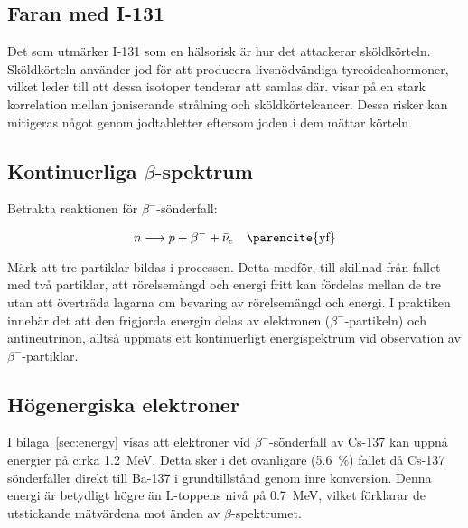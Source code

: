 \subsection{Faran med I-131}

Det som utmärker I-131 som en hälsorisk är hur det attackerar sköldkörteln.
Sköldkörteln använder jod för att producera livsnödvändiga tyreoideahormoner,
vilket leder till att dessa isotoper tenderar att samlas där. \cite{iodine}
visar på en stark korrelation mellan joniserande strålning och
sköldkörtelcancer. Dessa risker kan mitigeras något genom jodtabletter eftersom
joden i dem mättar körteln.

\subsection{Kontinuerliga $\beta$-spektrum}

Betrakta reaktionen för $\beta^-$-sönderfall:

\begin{equation}
    n \longrightarrow p + \beta^- + \bar{\nu}_e \quad \text{\parencite{yf}}
\end{equation}

Märk att tre partiklar bildas i processen. Detta medför, till skillnad från
fallet med två partiklar, att rörelsemängd och energi fritt kan fördelas
mellan de tre utan att överträda lagarna om bevaring av rörelsemängd och
energi. I praktiken innebär det att den frigjorda energin delas av elektronen
($\beta^-$-partikeln) och antineutrinon, alltså uppmäts ett kontinuerligt
energispektrum vid observation av $\beta^-$-partiklar.

\subsection{Högenergiska elektroner}

I bilaga~\ref{sec:energy} visas att elektroner vid $\beta^-$-sönderfall av
Cs-137 kan uppnå energier på cirka \qty{1.2}{\MeV}. Detta sker i det ovanligare
(\qty{5.6}{\percent}) fallet då Cs-137 sönderfaller direkt till Ba-137 i
grundtillstånd genom inre konversion. Denna energi är betydligt högre än
L-toppens nivå på \qty{0.7}{\MeV}, vilket förklarar de utstickande mätvärdena
mot änden av $\beta$-spektrumet.
